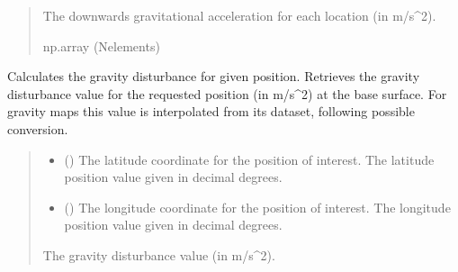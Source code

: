 \documentclass[letterpaper,10pt,english]{sphinxmanual}
\begin{document}
\begin{fulllineitems}
\begin{fulllineitems}
\begin{quote}
\begin{description}
\begin{itemize}
\end{itemize}

\sphinxAtStartPar
The downwards gravitational acceleration for each location
(in m/s\textasciicircum{}2).

\sphinxAtStartPar
np.array (N\sphinxhyphen{}elements)

\end{description}\end{quote}

\end{fulllineitems}


\begin{fulllineitems}
\label{\detokenize{modules/gravity/ggm_plus:qnav.gravity.ggm_plus.GGMPlusDist.get_disturbance}}
\pysigstartsignatures
{}
\pysigstopsignatures
\sphinxAtStartPar
Calculates the gravity disturbance for given position.
Retrieves the gravity disturbance value for the requested position
(in m/s\textasciicircum{}2) at the base surface. For gravity maps this value is
interpolated from its dataset, following possible conversion.
\begin{quote}\begin{description}
\begin{itemize}
\item {} 
\sphinxAtStartPar
{} () \textendash{} The latitude coordinate for the position of interest.
The latitude position value given in decimal degrees.

\item {} 
\sphinxAtStartPar
{} () \textendash{} The longitude coordinate for the position of interest.
The longitude position value given in decimal degrees.

\end{itemize}

\sphinxAtStartPar
The gravity disturbance value (in m/s\textasciicircum{}2).


\end{description}
\end{quote}
\end{fulllineitems}
\end{fulllineitems}
\end{document}
